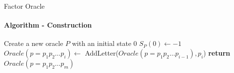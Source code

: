 \begin{frame}[fragile]{Factor Oracle}
  \framesubtitle{Algorithm - Construction}
  \begin{algorithm}[H] \caption{Construction of a Factor Oracle}\label{alg:fo}
    \begin{algorithmic}[1]
      \State Create a new oracle $P$ with an initial state 0
      \State $S_{P}(0) \gets -1$
      \State $Oracle(p=p_{1}p_{2}\dots{}p_{i}) \gets$
      AddLetter($Oracle(p=p_{1}p_{2}\dots{}p_{i-1}), p_{i}$)
      \EndFor
      \State  \textbf{return} $Oracle(p=p_{1}p_{2}\dots{}p_{m})$
      \EndFunction
    \end{algorithmic}
  \end{algorithm}

  \begin{center}
  \end{center}
\end{frame}

